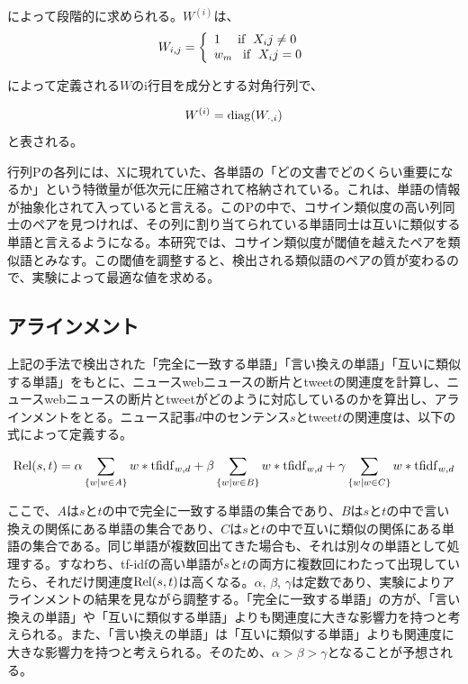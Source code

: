 \documentclass[12pt]{jarticle}
\begin{document}
によって段階的に求められる。$W^{(i)}$は、
\begin{displaymath}
W_{i,j} = \left\{
\begin{array}{l}
1\;\;\;\;\;{\rm if} \;\; X_ij \neq 0 \\
w_m\;\;\;{\rm if} \;\; X_ij = 0
\end{array}
\right.
\end{displaymath}

によって定義される$W$のi行目を成分とする対角行列で、

\begin{equation}
  W^{(i)} = {\rm diag}(W_{\cdot, i})
\end{equation}
と表される。

行列Pの各列には、Xに現れていた、各単語の「どの文書でどのくらい重要になるか」という特徴量が低次元に圧縮されて格納されている。これは、単語の情報が抽象化されて入っていると言える。このPの中で、コサイン類似度の高い列同士のペアを見つければ、その列に割り当てられている単語同士は互いに類似する単語と言えるようになる。本研究では、コサイン類似度が閾値を越えたペアを類似語とみなす。この閾値を調整すると、検出される類似語のペアの質が変わるので、実験によって最適な値を求める。

\subsection{アラインメント}
上記の手法で検出された「完全に一致する単語」「言い換えの単語」「互いに類似する単語」をもとに、ニュースwebニュースの断片とtweetの関連度を計算し、ニュースwebニュースの断片とtweetがどのように対応しているのかを算出し、アラインメントをとる。ニュース記事$d$中のセンテンス$s$とtweet$t$の関連度は、以下の式によって定義する。

\begin{equation}
  {\rm Rel}(s, t) = \alpha \sum_{\{w|w \in A\}} w * {\rm tfidf}_{w, d} +
                    \beta  \sum_{\{w|w \in B\}} w * {\rm tfidf}_{w, d} +
                    \gamma \sum_{\{w|w \in C\}} w * {\rm tfidf}_{w, d}
  \label{eq:rel}
\end{equation}

ここで、$A$は$s$と$t$の中で完全に一致する単語の集合であり、$B$は$s$と$t$の中で言い換えの関係にある単語の集合であり、$C$は$s$と$t$の中で互いに類似の関係にある単語の集合である。同じ単語が複数回出てきた場合も、それは別々の単語として処理する。すなわち、tf-idfの高い単語が$s$と$t$の両方に複数回にわたって出現していたら、それだけ関連度${\rm Rel}(s, t)$は高くなる。$\alpha$, $\beta$, $\gamma$は定数であり、実験によりアラインメントの結果を見ながら調整する。「完全に一致する単語」の方が、「言い換えの単語」や「互いに類似する単語」よりも関連度に大きな影響力を持つと考えられる。また、「言い換えの単語」は「互いに類似する単語」よりも関連度に大きな影響力を持つと考えられる。そのため、$\alpha > \beta > \gamma$となることが予想される。
\end{document}
